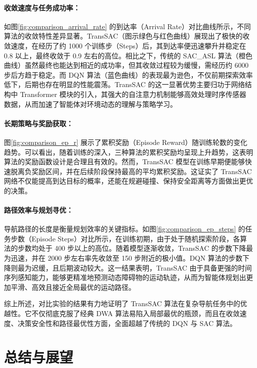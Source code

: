 \documentclass[
  oneside,
  degree=bachelor,
  fullwidthstop=false,
  fontset=fandol,
  times=false,
  minted=true,
  biblatex=true,
]{tongjithesis}
\begin{document}
\subsubsection{收敛速度与任务成功率：} 如图\ref{fig:comparison_arrival_rate} 的到达率（Arrival Rate）对比曲线所示，不同算法的收敛特性差异显著。TransSAC（图示绿色与红色曲线）展现出了极快的收敛速度，在经历了约 1000 个训练步（Steps）后，其到达率便迅速攀升并稳定在 0.8 以上，最终收敛于 0.9 左右的高位。相比之下，传统的 SAC\_ASL 算法（橙色曲线）虽然最终也能达到相近的成功率，但其收敛过程较为缓慢，需经历约 6000 步后方趋于稳定。而 DQN 算法（蓝色曲线）的表现最为逊色，不仅前期探索效率低下，后期也存在明显的性能震荡。TransSAC 的这一显著优势主要归功于网络结构中 Transformer 模块的引入，其强大的自注意力机制能够高效处理时序传感器数据，从而加速了智能体对环境动态的理解与策略学习。

\subsubsection{长期策略与奖励获取：} 图\ref{fig:comparison_ep_r} 展示了累积奖励（Episode Reward）随训练轮数的变化趋势。可以看出，随着训练的深入，三种算法的累积奖励均呈现上升趋势，这表明算法的奖励函数设计是合理且有效的。然而，TransSAC 模型在训练早期便能够快速脱离负奖励区间，并在后续阶段保持最高的平均累积奖励。这证实了 TransSAC 网络不仅能提高到达目标的概率，还能在规避碰撞、保持安全距离等方面做出更优的决策。

\subsubsection{路径效率与规划寻优：} 导航路径的长度是衡量规划效率的关键指标。如图\ref{fig:comparison_ep_steps} 的任务步数（Episode Steps）对比所示，在训练初期，由于处于随机探索阶段，各算法的步数均处于 400 步以上的高位。随着模型逐渐收敛，TransSAC 的步数下降最为迅速，并在 2000 步左右率先收敛至 150 步附近的极小值。DQN 算法的步数下降则最为迟缓，且后期波动较大。这一结果表明，TransSAC 由于具备更强的时间序列感知能力，能够更精准地预测动态障碍物的运动轨迹，从而为智能体规划出更加平滑、高效且接近全局最优的运动路径。

综上所述，对比实验的结果有力地证明了 TransSAC 算法在复杂导航任务中的优越性。它不仅彻底克服了经典 DWA 算法易陷入局部最优的瓶颈，而且在收敛速度、决策安全性和路径最优性方面，全面超越了传统的 DQN 与 SAC 算法。
\chapter{总结与展望}\label{chap:conclusion}
\end{document}
